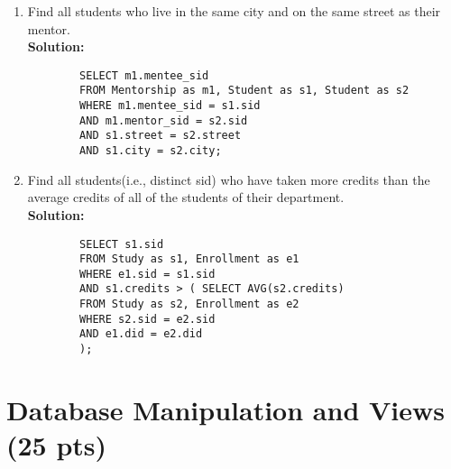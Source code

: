 \documentclass[paper=a4, fontsize=11pt]{scrartcl}
\numberwithin{equation}{section}		%
\numberwithin{figure}{section}			%
\numberwithin{table}{section}				%
\begin{document}
	\begin{enumerate}
		\item Find all students who live in the same city and on the same street as their mentor.\\
		\textbf{Solution: }
		\begin{lstlisting}
		SELECT m1.mentee_sid
		FROM Mentorship as m1, Student as s1, Student as s2
		WHERE m1.mentee_sid = s1.sid
		AND m1.mentor_sid = s2.sid
		AND s1.street = s2.street
		AND s1.city = s2.city;
		\end{lstlisting}
		
		
		\item Find all students(i.e., distinct sid) who have taken more credits than the average credits of all of the students of their department.\\
		\textbf{Solution: }
		\begin{lstlisting}
		SELECT s1.sid
		FROM Study as s1, Enrollment as e1
		WHERE e1.sid = s1.sid
		AND s1.credits > ( SELECT AVG(s2.credits)
		FROM Study as s2, Enrollment as e2
		WHERE s2.sid = e2.sid
		AND e1.did = e2.did
		);
		\end{lstlisting}
		
		
	\end{enumerate}
	
	
	\section{Database Manipulation and Views (25 pts)}
	
\end{document}
